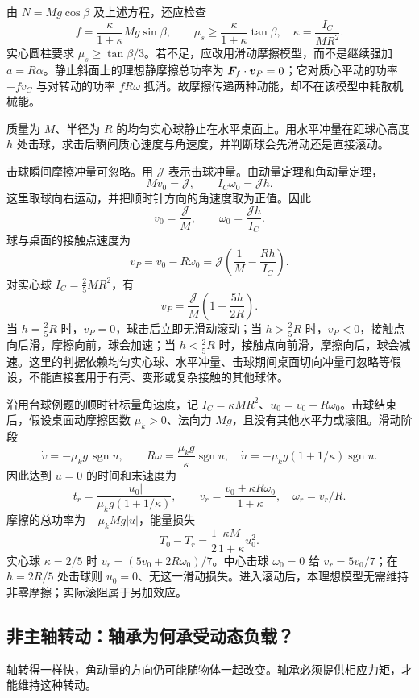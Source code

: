 由 $N=Mg\cos\beta$ 及上述方程，还应检查
\[
f=\frac{\kappa}{1+\kappa}Mg\sin\beta,\qquad
\mu_s\ge\frac{\kappa}{1+\kappa}\tan\beta,\quad
\kappa=\frac{I_C}{MR^2}.
\]
实心圆柱要求 $\mu_s\ge\tan\beta/3$。若不足，应改用滑动摩擦模型，而不是继续强加 $a=R\alpha$。静止斜面上的理想静摩擦总功率为 $\boldsymbol{F}_f\cdot\boldsymbol{v}_P=0$；它对质心平动的功率 $-fv_C$ 与对转动的功率 $fR\omega$ 抵消。故摩擦传递两种动能，却不在该模型中耗散机械能。



\begin{example}[台球击球点]
质量为 \(M\)、半径为 \(R\) 的均匀实心球静止在水平桌面上。用水平冲量在距球心高度 \(h\) 处击球，求击后瞬间质心速度与角速度，并判断球会先滑动还是直接滚动。

击球瞬间摩擦冲量可忽略。用 \(\mathcal J\) 表示击球冲量。由动量定理和角动量定理，
\[
Mv_0=\mathcal J,\qquad I_C\omega_0=\mathcal J h.
\]
这里取球向右运动，并把顺时针方向的角速度取为正值。因此
\[
v_0=\frac{\mathcal J}{M},\qquad
\omega_0=\frac{\mathcal J h}{I_C}.
\]
球与桌面的接触点速度为
\[
v_P=v_0-R\omega_0
=\mathcal J\left(\frac1M-\frac{Rh}{I_C}\right).
\]
对实心球 \(I_C=\frac25MR^2\)，有
\[
v_P=\frac{\mathcal J}{M}\left(1-\frac{5h}{2R}\right).
\]
当 \(h=\frac25R\) 时，\(v_P=0\)，球击后立即无滑动滚动；当 \(h>\frac25R\) 时，\(v_P<0\)，接触点向后滑，摩擦向前，球会加速；当 \(h<\frac25R\) 时，接触点向前滑，摩擦向后，球会减速。这里的判据依赖均匀实心球、水平冲量、击球期间桌面切向冲量可忽略等假设，不能直接套用于有壳、变形或复杂接触的其他球体。
\end{example}

\begin{example}[击后滑动怎样过渡到滚动]
沿用台球例题的顺时针标量角速度，记 $I_C=\kappa MR^2$、$u_0=v_0-R\omega_0$。击球结束后，假设桌面动摩擦因数 $\mu_k>0$、法向力 $Mg$，且没有其他水平力或滚阻。滑动阶段
\[
\dot v=-\mu_kg\,\operatorname{sgn}u,\qquad
R\dot\omega=\frac{\mu_kg}{\kappa}\operatorname{sgn}u,
\quad \dot u=-\mu_kg(1+1/\kappa)\operatorname{sgn}u.
\]
因此达到 $u=0$ 的时间和末速度为
\[
t_r=\frac{|u_0|}{\mu_kg(1+1/\kappa)},\qquad
v_r=\frac{v_0+\kappa R\omega_0}{1+\kappa},\quad \omega_r=v_r/R.
\]
摩擦的总功率为 $-\mu_kMg|u|$，能量损失
\[
T_0-T_r=\frac12\frac{\kappa M}{1+\kappa}u_0^2.
\]
实心球 $\kappa=2/5$ 时 $v_r=(5v_0+2R\omega_0)/7$。中心击球 $\omega_0=0$ 给 $v_r=5v_0/7$；在 $h=2R/5$ 处击球则 $u_0=0$、无这一滑动损失。进入滚动后，本理想模型无需维持非零摩擦；实际滚阻属于另加效应。
\end{example}


\subsection{非主轴转动：轴承为何承受动态负载？}
轴转得一样快，角动量的方向仍可能随物体一起改变。轴承必须提供相应力矩，才能维持这种转动。

